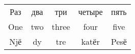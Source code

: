\documentclass{article}
\begin{document}
\begin{tabular}{c c c c c}
Раз & два & три & четыре & пять \\
One & two & three & four & five \\
Njё & dy & tre & katёr & Pesё
\end{tabular}
\end{document}

